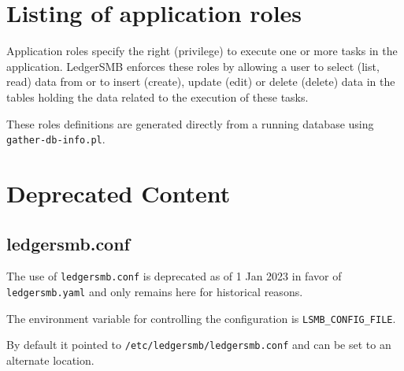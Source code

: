 \chapter{Listing of application roles}
\label{app-role-listing}

Application roles  specify the right (privilege) to execute one or more tasks in the application.
LedgerSMB enforces these roles by allowing a user to select (list, read) data from or to
insert (create), update (edit) or delete (delete) data in the tables holding the data
related to the execution of these tasks.



\ifpdf
      \newcommand{\htmlspacing}{}
\else
      \newcommand{\htmlspacing}{ \hfill \\}
\fi

These roles definitions are generated directly from a running database using  \texttt{gather-db-info.pl}.



\chapter{Deprecated Content}
\label{app-deprecated-content}

\section{ledgersmb.conf}
\label{app-deprecated-ledgersmb-conf}

The use of \texttt{ledgersmb.conf} \index{ } is deprecated as of 1 Jan 2023 in favor of \texttt{ledgersmb.yaml}  and only remains here for historical reasons.  

The environment variable for controlling the configuration is \texttt{LSMB\_CONFIG\_FILE}.

By default it pointed to \texttt{/etc/ledgersmb/ledgersmb.conf} and can be set to an alternate location.

